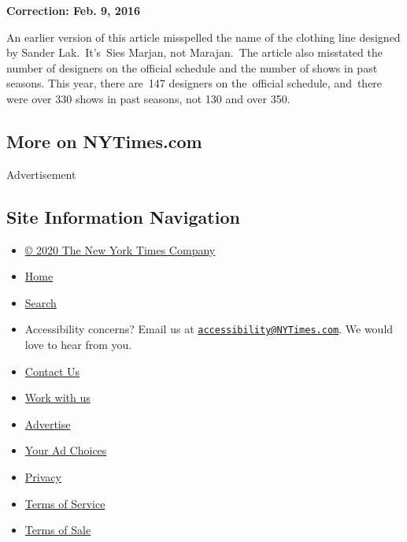\textbf{Correction: Feb. 9, 2016}

An earlier version of this article misspelled the name of the clothing
line designed by Sander Lak.~It's~Sies Marjan, not Marajan.~The article
also misstated the number of designers on the official schedule and the
number of shows in past seasons. This year, there are~147 designers on
the~official schedule, and~there were over 330 shows in past seasons,
not 130 and over 350.

\hypertarget{more-on-nytimescom}{%
\subsection{More on NYTimes.com}\label{more-on-nytimescom}}

Advertisement

\hypertarget{site-information-navigation}{%
\subsection{Site Information
Navigation}\label{site-information-navigation}}

\begin{itemize}
\tightlist
\item
  \href{https://help.nytimes3xbfgragh.onion/hc/en-us/articles/115014792127-Copyright-notice}{©
  2020 The New York Times Company}
\item
  \href{https://www.nytimes3xbfgragh.onion}{Home}
\item
  \href{https://www.nytimes3xbfgragh.onion/search/}{Search}
\item
  Accessibility concerns? Email us at
  \href{mailto:accessibility@NYTimes.com}{\nolinkurl{accessibility@NYTimes.com}}.
  We would love to hear from you.
\item
  \href{https://help.nytimes3xbfgragh.onion/hc/en-us/articles/115015385887-Contact-Us}{Contact
  Us}
\item
  \href{https://www.nytco.com/careers/}{Work with us}
\item
  \href{https://nytmediakit.com/}{Advertise}
\item
  \href{https://help.nytimes3xbfgragh.onion/hc/en-us/articles/115014892108-Privacy-policy\#pp}{Your
  Ad Choices}
\item
  \href{https://help.nytimes3xbfgragh.onion/hc/en-us/articles/115014892108-Privacy-policy}{Privacy}
\item
  \href{https://help.nytimes3xbfgragh.onion/hc/en-us/articles/115014893428-Terms-of-service}{Terms
  of Service}
\item
  \href{https://help.nytimes3xbfgragh.onion/hc/en-us/articles/115014893968-Terms-of-sale}{Terms
  of Sale}
\end{itemize}

